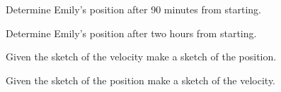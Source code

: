 \begin{problem}
\begin{subproblem}
    \item Determine Emily's position after 90 minutes from starting.
      \vspace{3em}

    \item Determine Emily's position after two hours from starting.
      \vspace{3em}


  \end{subproblem}


  \clearpage

\item Given the sketch of the velocity make a sketch of the position.

  \scalebox{0.65}{}

\item Given the sketch of the position make a sketch of the velocity.

  \scalebox{0.65}{}

\end{problem}




